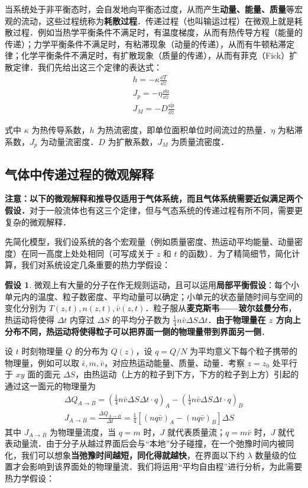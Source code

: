 

当系统处于非平衡态时，会自发地向平衡态过度，从而产生\textbf{动量、能量、质量}等宏观的流动，这些过程统称为\textbf{耗散过程}．传递过程（也叫输运过程）在微观上就是耗散过程．例如当热学平衡条件不满足时，有温度梯度，从而有热传导方程（能量的传递）；力学平衡条件不满足时，有粘滞现象（动量的传递），从而有牛顿粘滞定律；化学平衡条件不满足时，有扩散现象（质量的传递），从而有菲克（Fick）扩散定律．我们先给出这三个定律的表达式：
\begin{align}
h=-\kappa \frac{\dd T}{\dd z}\\
J_p=-\eta \frac{\dd u}{\dd z}\\
J_M=-D\frac{\dd \rho}{\dd z}
\end{align}

式中 $\kappa$ 为热传导系数，$h$ 为热流密度，即单位面积单位时间流过的热量．$\eta$ 为粘滞系数，$J_p$ 为动量流密度．$D$ 为扩散系数，$J_M$ 为质量流密度．

\subsection{气体中传递过程的微观解释}
\textbf{注意：以下的微观解释和推导仅适用于\textbf{气体系统}，而且气体系统需要近似满足两个假设．}对于一般流体也有这三个定律，但与气态系统的传递过程有所不同，需要更复杂的微观解释．

先简化模型，我们设系统的各个宏观量（例如质量密度、热运动平均能量、动量密度）在同一高度上处处相同（可写成关于 $z$ 和 $t$ 的函数）．为了精简细节，简化计算，我们对系统设定几条重要的热力学假设：

\textbf{假设 1}. 微观上有大量的分子在作无规则运动，且可以运用\textbf{局部平衡假设}：每个小单元内的温度、粒子数密度、平均动量可以确定；小单元的状态量随时间与空间的变化分别为 $T(z,t),n(z,t),\bar v(z,t)$．粒子服从\textbf{麦克斯韦——玻尔兹曼分布}，热运动将使得 $\Delta t$ 内穿过 $\Delta S$ 的平均分子数为 $\frac{1}{4}n\bar v \Delta S\Delta t$．\textbf{由于物理量在 $z$ 方向上分布不同，热运动将使得粒子可以把界面一侧的物理量带到界面另一侧}．

设 $t$ 时刻物理量 $Q$ 的分布为 $Q(z)$，设 $q=Q/N$ 为平均意义下每个粒子携带的物理量，例如可以取 $\bar \epsilon,m,\bar v$，对应热运动能量、质量、动量．考察 $z=z_0$ 处平行于 $xy$ 面的面元 $\Delta S$，由热运动（上方的粒子到下方，下方的粒子到上方）引起的通过这一面元的物理量为
\begin{align}
\Delta Q_{A\rightarrow B}=(\frac{1}{4}n\bar v \Delta S\Delta t\cdot q)_A-(\frac{1}{4}n\bar v \Delta S\Delta t\cdot q)_B
\\
J_{A\rightarrow B}=\frac{\Delta Q_{A\rightarrow B}}{\Delta t}=\frac{1}{4}[(nq\bar v)_A-(nq\bar v)_B]\Delta S
\end{align}
其中 $J_{A\rightarrow B}$ 为物理量流度，当 $q=m$ 时，$J$ 就代表质量流；$q=m\bar v$ 时，$J$ 就代表动量流．由于分子从越过界面后会与“本地”分子碰撞，在一个弛豫时间内被同化，我们可以想象\textbf{当弛豫时间越短，同化得就越快}，在界面以下约 $\lambda$ 数量级的位置才会影响到该界面处的物理量流．我们将运用“平均自由程”进行分析，为此需要热力学假设：

